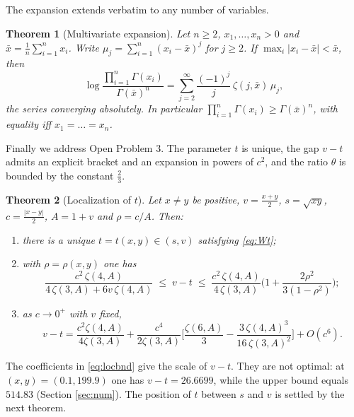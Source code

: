 \documentclass[11pt,a4paper]{amsart}
\newtheorem{theorem}{Theorem}[section]
\theoremstyle{definition}
\begin{document}
The expansion extends verbatim to any number of variables.

\begin{theorem}[Multivariate expansion]\label{thm:multi}
Let $n\ge2$, $x_{1},\dots,x_{n}>0$ and $\bar x=\frac1n\sum_{i=1}^{n}x_{i}$. Write
$\mu_{j}=\sum_{i=1}^{n}(x_{i}-\bar x)^{j}$ for $j\ge2$. If
$\max_{i}|x_{i}-\bar x|<\bar x$, then
\begin{equation}\label{eq:multi}
  \log\frac{\prod_{i=1}^{n}\Gamma(x_{i})}{\Gamma(\bar x)^{n}}
   =\sum_{j=2}^{\infty}\frac{(-1)^{j}}{j}\,\zeta(j,\bar x)\,\mu_{j},
\end{equation}
the series converging absolutely. In particular
$\prod_{i=1}^{n}\Gamma(x_{i})\ge\Gamma(\bar x)^{n}$, with equality iff $x_{1}=\dots=x_{n}$.
\end{theorem}

Finally we address Open Problem 3. The parameter $t$ is unique, the gap $v-t$ admits an
explicit bracket and an expansion in powers of $c^{2}$, and the ratio $\theta$ is bounded
by the constant $\frac23$.

\begin{theorem}[Localization of $t$]\label{thm:loc}
Let $x\ne y$ be positive, $v=\tfrac{x+y}{2}$, $s=\sqrt{xy}$, $c=\tfrac{|x-y|}{2}$,
$A=1+v$ and $\rho=c/A$. Then:
\begin{enumerate}
\item[\rm(i)] there is a unique $t=t(x,y)\in(s,v)$ satisfying \eqref{eq:Wt};
\item[\rm(ii)] with $\rho=\rho(x,y)$ one has
  \begin{equation}\label{eq:locbnd}
    \frac{c^{2}\,\zeta(4,A)}{4\,\zeta(3,A)+6v\,\zeta(4,A)}
    \;\le\; v-t \;\le\;
    \frac{c^{2}\,\zeta(4,A)}{4\,\zeta(3,A)}\Big(1+\frac{2\rho^{2}}{3(1-\rho^{2})}\Big);
  \end{equation}
\item[\rm(iii)] as $c\to0^{+}$ with $v$ fixed,
  \begin{equation}\label{eq:locasym}
    v-t=\frac{c^{2}\zeta(4,A)}{4\zeta(3,A)}
     +\frac{c^{4}}{2\zeta(3,A)}\Big[\frac{\zeta(6,A)}{3}
       -\frac{3\,\zeta(4,A)^{3}}{16\,\zeta(3,A)^{2}}\Big]+O(c^{6}).
  \end{equation}
\end{enumerate}
\end{theorem}

The coefficients in \eqref{eq:locbnd} give the scale of $v-t$. They are not optimal: at
$(x,y)=(0.1,199.9)$ one has $v-t=26.6699$, while the upper bound equals $514.83$
(Section \ref{sec:num}). The position of $t$ between $s$ and $v$ is settled by the next
theorem.
\end{document}
